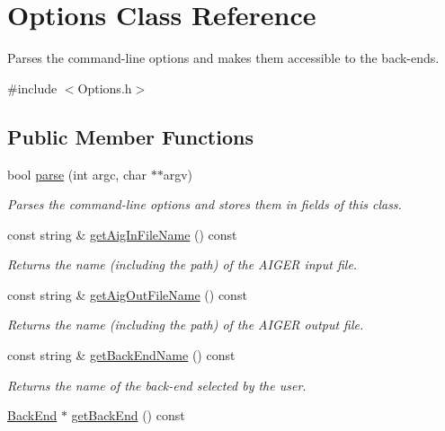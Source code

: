 \hypertarget{classOptions}{\section{Options Class Reference}
\label{classOptions}
}


Parses the command-\/line options and makes them accessible to the back-\/ends.  




{\ttfamily \#include $<$Options.\-h$>$}

\subsection*{Public Member Functions}
\begin{DoxyCompactItemize}
\item 
bool \hyperlink{classOptions_ade5d49fc467ba040926341daa1d9a06f}{parse} (int argc, char $\ast$$\ast$argv)
\begin{DoxyCompactList}\small\item\em Parses the command-\/line options and stores them in fields of this class. \end{DoxyCompactList}\item 
const string \& \hyperlink{classOptions_aaf9b09b226b91d4c2f9830624fd4182f}{get\-Aig\-In\-File\-Name} () const 
\begin{DoxyCompactList}\small\item\em Returns the name (including the path) of the A\-I\-G\-E\-R input file. \end{DoxyCompactList}\item 
const string \& \hyperlink{classOptions_ad7c543adeab5d10177f3a7a279f807e1}{get\-Aig\-Out\-File\-Name} () const 
\begin{DoxyCompactList}\small\item\em Returns the name (including the path) of the A\-I\-G\-E\-R output file. \end{DoxyCompactList}\item 
const string \& \hyperlink{classOptions_a2b7a4169cf0f3366e5035ec5b497e585}{get\-Back\-End\-Name} () const 
\begin{DoxyCompactList}\small\item\em Returns the name of the back-\/end selected by the user. \end{DoxyCompactList}\item 
\hyperlink{classBackEnd}{Back\-End} $\ast$ \hyperlink{classOptions_ab34857dfe0fdfd75842372b33fc3d515}{get\-Back\-End} () const 
$$
\end{DoxyCompactItemize}
